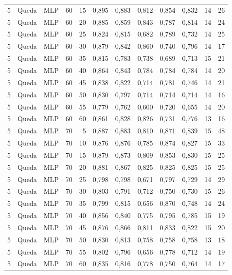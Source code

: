\begin{longtable}{ccclrrrrrrrr}
5 & Queda & MLP & 60 & 15 & 0,895 & 0,883 & 0,812 & 0,854 & 0,832 & 14 & 26 \\
5 & Queda & MLP & 60 & 20 & 0,885 & 0,859 & 0,843 & 0,787 & 0,814 & 14 & 24 \\
5 & Queda & MLP & 60 & 25 & 0,824 & 0,815 & 0,682 & 0,789 & 0,732 & 14 & 25 \\
5 & Queda & MLP & 60 & 30 & 0,879 & 0,842 & 0,860 & 0,740 & 0,796 & 14 & 17 \\
5 & Queda & MLP & 60 & 35 & 0,815 & 0,783 & 0,738 & 0,689 & 0,713 & 15 & 21 \\
5 & Queda & MLP & 60 & 40 & 0,864 & 0,843 & 0,784 & 0,784 & 0,784 & 14 & 20 \\
5 & Queda & MLP & 60 & 45 & 0,838 & 0,822 & 0,714 & 0,781 & 0,746 & 14 & 21 \\
5 & Queda & MLP & 60 & 50 & 0,830 & 0,797 & 0,714 & 0,714 & 0,714 & 14 & 16 \\
5 & Queda & MLP & 60 & 55 & 0,779 & 0,762 & 0,600 & 0,720 & 0,655 & 14 & 20 \\
5 & Queda & MLP & 60 & 60 & 0,861 & 0,828 & 0,826 & 0,731 & 0,776 & 13 & 16 \\
5 & Queda & MLP & 70 & 5 & 0,887 & 0,883 & 0,810 & 0,871 & 0,839 & 15 & 48 \\
5 & Queda & MLP & 70 & 10 & 0,876 & 0,876 & 0,785 & 0,874 & 0,827 & 15 & 33 \\
5 & Queda & MLP & 70 & 15 & 0,879 & 0,873 & 0,809 & 0,853 & 0,830 & 15 & 25 \\
5 & Queda & MLP & 70 & 20 & 0,881 & 0,867 & 0,825 & 0,825 & 0,825 & 15 & 25 \\
5 & Queda & MLP & 70 & 25 & 0,798 & 0,798 & 0,671 & 0,797 & 0,729 & 14 & 29 \\
5 & Queda & MLP & 70 & 30 & 0,803 & 0,791 & 0,712 & 0,750 & 0,730 & 15 & 26 \\
5 & Queda & MLP & 70 & 35 & 0,799 & 0,815 & 0,656 & 0,870 & 0,748 & 14 & 24 \\
5 & Queda & MLP & 70 & 40 & 0,856 & 0,840 & 0,775 & 0,795 & 0,785 & 15 & 19 \\
5 & Queda & MLP & 70 & 45 & 0,876 & 0,866 & 0,811 & 0,833 & 0,822 & 15 & 20 \\
5 & Queda & MLP & 70 & 50 & 0,830 & 0,813 & 0,758 & 0,758 & 0,758 & 13 & 18 \\
5 & Queda & MLP & 70 & 55 & 0,802 & 0,796 & 0,656 & 0,778 & 0,712 & 14 & 19 \\
5 & Queda & MLP & 70 & 60 & 0,835 & 0,816 & 0,778 & 0,750 & 0,764 & 14 & 17 \\

\end{longtable}
